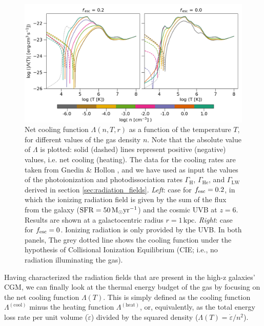\begin{figure}[t]
    \centering
    \includegraphics[width=1.0\textwidth]{plots/net_cooling.png}
    \caption{Net cooling function $\Lambda(n,T,r)$ as a function of the temperature $T$, for different values of the gas density $n$.
    Note that the absolute value of $\Lambda$ is plotted: solid (dashed) lines represent positive (negative) values, i.e. net cooling (heating). 
    The data for the cooling rates are taken from Gnedin \& Hollon \citep{gnedin2012cooling}, and we have used as input the values of the photoionization and photodissociation rates $\Gamma_{\mathrm{H}}$, $\Gamma_{\mathrm{He}}$, and $\Gamma_{\mathrm{LW}}$ derived in section  \ref{sec:radiation_fields}.
    {\it Left}: case for $f_{\rm esc}=0.2$, in which the ionizing radiation field is given by the sum of the flux from the galaxy ($\mathrm{SFR}=50\,{\rm M}_{\odot}\mathrm{yr}^{-1}$) and the cosmic UVB at $z=6$. Results are shown at a galactocentric radius $r=1\,\mathrm{kpc}$. {\it Right}: case for $f_{\rm esc}=0$. Ionizing radiation is only provided by the UVB. In both panels, The grey dotted line shows the cooling function under the hypothesis of Collisional Ionization Equilibrium (CIE; i.e., no radiation illuminating the gas).
    \label{fig:global_cooling}
    }
\end{figure}

Having characterized the radiation fields that are present in the high-z galaxies' CGM, we can finally look at the thermal energy budget of the gas by focusing on the net cooling function $\Lambda(T)$. This is simply defined as the cooling function $\Lambda^\mathrm{(cool)}$ minus the heating function $\Lambda^\mathrm{(heat)}$, or, equivalently, as the total energy loss rate per unit volume ($\dot{\varepsilon}$) divided by the squared density ($\Lambda(T)=\dot{\varepsilon}/n^2$).

